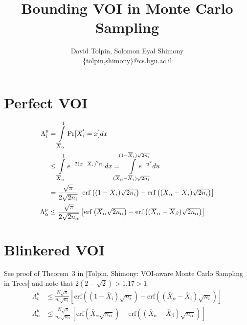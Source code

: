 \documentclass{article}
\title{Bounding VOI in Monte Carlo Sampling}
\author {David Tolpin, Solomon Eyal Shimony \\
\{tolpin,shimony\}@cs.bgu.ac.il}
\begin{document}
\maketitle

\section{Perfect VOI}

\begin{align}
\Lambda_i^p&=\int\limits_{\overline X_\alpha}^1\Pr[\overline X_i'=x]dx\nonumber\\
&\le \int\limits_{\overline X_\alpha}^1e^{-2(x-\overline X_i)^2n_i}dx
=\hspace{-1em}\int\limits_{(\overline X_\alpha - \overline X_i)\sqrt{2n_i}}^{(1- \overline X_i)\sqrt{2n_i}}\hspace{-2em}e^{-u^2}du\nonumber\\
&=\frac {\sqrt \pi} {2 \sqrt {2n_i}}
  \left[\mathrm{erf}\left((1-\overline X_i)\sqrt {2n_i}\right)
      -\mathrm{erf}\left((\overline X_\alpha - \overline X_i)\sqrt{2n_i}\right)\right]\nonumber\\
\Lambda_\alpha^p&\le\frac {\sqrt \pi} {2 \sqrt {2n_\alpha}}
  \left[\mathrm{erf}\left(\overline X_\alpha\sqrt {2n_\alpha}\right)
      -\mathrm{erf}\left((\overline X_\alpha - \overline X_\beta)\sqrt{2n_\alpha}\right)\right]
\label{eqn:erf-perfect}
\end{align}

\section{Blinkered VOI}

See proof of Theorem~3 in [Tolpin, Shimony: VOI-aware Monte Carlo
  Sampling in Trees] and note that $2(2-\sqrt{2})>1.17>1$:
\begin{align}
\Lambda_i^b&\le\frac {N\sqrt \pi} {n_i \sqrt {n_i}}
  \left[\mathrm{erf}\left((1-\overline X_i)\sqrt {n_i}\right)
      -\mathrm{erf}\left((\overline X_\alpha - \overline X_i)\sqrt{n_i}\right)\right]\nonumber\\
\Lambda_\alpha^b&\le\frac {N\sqrt \pi} {n_\alpha \sqrt {n_\alpha}}
  \left[\mathrm{erf}\left(\overline X_\alpha\sqrt {n_\alpha}\right)
      -\mathrm{erf}\left((\overline X_\alpha - \overline X_\beta)\sqrt{n_\alpha}\right)\right]
\label{eqn:erf-blinkered}
\end{align}



\end{document}
